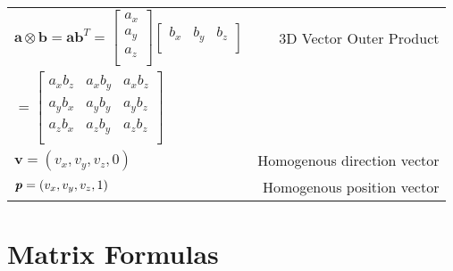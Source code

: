 \documentclass{article}
\begin{document}
{\begin{tabulary}{8in}{LR}
$\textbf{a} \otimes \textbf{b} = \textbf{a} \textbf{b}^T = \begin{bmatrix}a_x \\ a_y \\ a_z \\ \end{bmatrix}
\begin{bmatrix}b_x & b_y & b_z \\ \end{bmatrix} $ 
& 3D Vector Outer Product \\

$ =
\begin{bmatrix}
a_x b_z & a_x b_y & a_x b_z \\
a_y b_x & a_y b_y & a_y b_z \\
a_z b_x & a_z b_y & a_z b_z \\
\end{bmatrix}
$ & \\

$ \textbf{v} = (v_x, v_y, v_z, 0)$ & Homogenous direction vector \\
$ \textbf{\textit{p}} = (v_x, v_y, v_z, 1)$ & Homogenous position vector \\

\end{tabulary} %
}

\section{Matrix Formulas}
\end{document}
